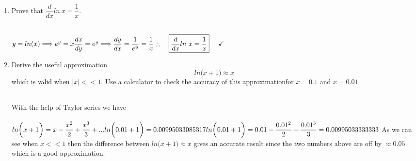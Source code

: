 \documentclass[fleqn]{article}
\begin{document}
\begin{enumerate}
\begin{enumerate}
      \item Prove that $\dfrac{d}{dx} ln ~ x=\dfrac{1}{x}$.

        \textcolor{hwColor}{
          \\
          $
            y=ln(x) \Longrightarrow e^y=x
            \\
            \\
            \dfrac{dx}{dy}=e^y \Longrightarrow \dfrac{dy}{dx}=\dfrac{1}{e^y}=\dfrac{1}{x}
            \\
            \\
            \\
            \therefore ~~~ \boxed{
              \dfrac{d}{dx} ln ~ x=\dfrac{1}{x}
            } ~~~~ \checkmark
            \\
            \\
          $
        }

      \item Derive the useful approximation 
      $$
        ln \bigg( x+1 \bigg) \approx x
      $$
      which is valid when $|x| << 1$. Use a calculator to check the accuracy of this approximationfor $x=0.1$ and $x=0.01$

        \textcolor{hwColor}{
          \\
          With the help of Taylor series we have
          \\
          \\ 
          $
            ln \bigg( x+1 \bigg)=x-\dfrac{x^2}{2}+\dfrac{x^3}{3}+...
            \\
            \\
            \\
            ln \bigg( 0.01+1 \bigg)=0.00995033085317
            \\
            \\
            \\
            ln \bigg( 0.01+1 \bigg)=0.01-\dfrac{0.01^2}{2}+\dfrac{0.01^3}{3}=0.00995033333333
            \\
            \\
          $
          As we can see when $x << 1$ then the difference between $ln \bigg( x+1 \bigg) \approx x$ 
          gives an accurate result since the two numbers above are off by $\approx 0.05$ which is a good
          approximation.
          \\
        }

    \end{enumerate}


\end{enumerate}
\end{document}
